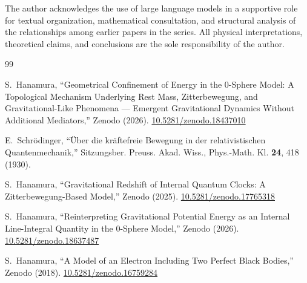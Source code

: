 \documentclass[%
 reprint, amsmath,amssymb, aps, prb, ]{revtex4-2}
\numberwithin{equation}{section}
\begin{document}
\begin{acknowledgments}
The author acknowledges the use of large language models in a supportive role for textual organization, mathematical consultation, and structural analysis of the relationships among earlier papers in the series. All physical interpretations, theoretical claims, and conclusions are the sole responsibility of the author.
\end{acknowledgments}

\begin{thebibliography}{99}

S.~Hanamura, ``Geometrical Confinement of Energy in the 0-Sphere Model: A Topological Mechanism Underlying Rest Mass, Zitterbewegung, and Gravitational-Like Phenomena --- Emergent Gravitational Dynamics Without Additional Mediators,'' Zenodo (2026). \href{https://doi.org/10.5281/zenodo.18437010}{10.5281/zenodo.18437010}

E.~Schr\"odinger, ``\"Uber die kr\"aftefreie Bewegung in der relativistischen Quantenmechanik,'' Sitzungsber. Preuss. Akad. Wiss., Phys.-Math. Kl. \textbf{24}, 418 (1930).

S.~Hanamura, ``Gravitational Redshift of Internal Quantum Clocks: A Zitterbewegung-Based Model,'' Zenodo (2025). \href{https://doi.org/10.5281/zenodo.17765318}{10.5281/zenodo.17765318}

S.~Hanamura, ``Reinterpreting Gravitational Potential Energy as an Internal Line-Integral Quantity in the 0-Sphere Model,'' Zenodo (2026). \href{https://doi.org/10.5281/zenodo.18637487}{10.5281/zenodo.18637487}

S.~Hanamura, ``A Model of an Electron Including Two Perfect Black Bodies,'' Zenodo (2018). \href{https://doi.org/10.5281/zenodo.16759284}{10.5281/zenodo.16759284}


\end{thebibliography}
\end{document}
